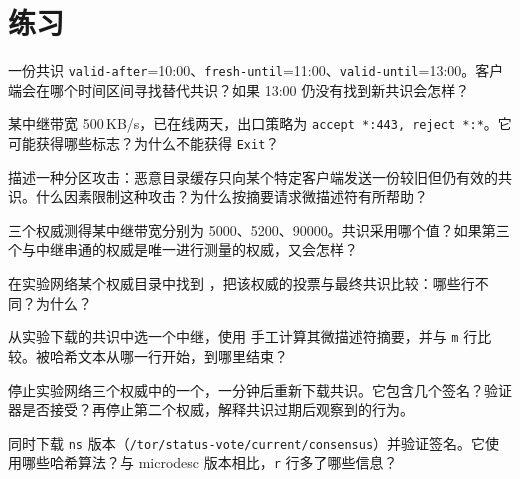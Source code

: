 \section*{练习}

\begin{esercizio}[1]\label{es:12-validita}
一份共识 \texttt{valid-after}=10:00、\texttt{fresh-until}=11:00、\texttt{valid-until}=13:00。客户端会在哪个时间区间寻找替代共识？如果 13:00 仍没有找到新共识会怎样？
\end{esercizio}

\begin{esercizio}[1]\label{es:12-flag}
某中继带宽 500\,KB/s，已在线两天，出口策略为 \texttt{accept *:443, reject *:*}。它可能获得哪些标志？为什么不能获得 \texttt{Exit}？
\end{esercizio}

\begin{esercizio}[2]\label{es:12-partizione}
描述一种分区攻击：恶意目录缓存只向某个特定客户端发送一份较旧但仍有效的共识。什么因素限制这种攻击？为什么按摘要请求微描述符有所帮助？
\end{esercizio}

\begin{esercizio}[2]\label{es:12-mediana}
三个权威测得某中继带宽分别为 5000、5200、90000。共识采用哪个值？如果第三个与中继串通的权威是唯一进行测量的权威，又会怎样？
\end{esercizio}

\begin{esercizio}[2]\label{es:12-voti}
在实验网络某个权威目录中找到 ，把该权威的投票与最终共识比较：哪些行不同？为什么？
\end{esercizio}

\begin{esercizio}[2]\label{es:12-md}
从实验下载的共识中选一个中继，使用  手工计算其微描述符摘要，并与 \texttt{m} 行比较。被哈希文本从哪一行开始，到哪里结束？
\end{esercizio}

\begin{esercizio}[3]\label{es:12-autorita}
停止实验网络三个权威中的一个，一分钟后重新下载共识。它包含几个签名？验证器是否接受？再停止第二个权威，解释共识过期后观察到的行为。
\end{esercizio}

\begin{esercizio}[3]\label{es:12-ns}
同时下载 \texttt{ns} 版本（\nolinkurl{/tor/status-vote/current/consensus}）并验证签名。它使用哪些哈希算法？与 microdesc 版本相比，\texttt{r} 行多了哪些信息？
\end{esercizio}

